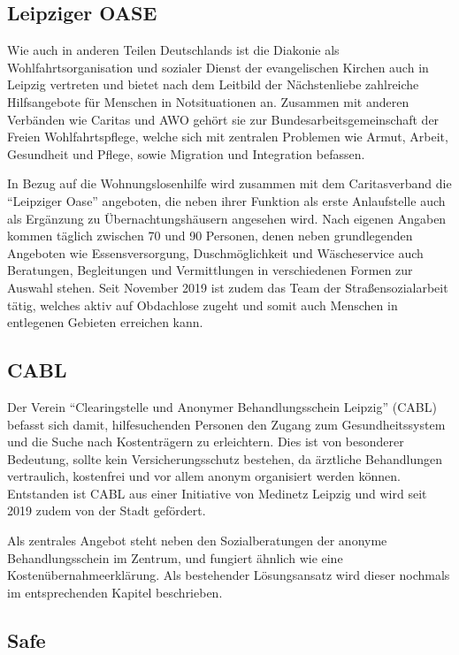 \subsection{Leipziger OASE}

Wie auch in anderen Teilen Deutschlands ist die Diakonie als Wohlfahrtsorganisation und sozialer Dienst der evangelischen Kirchen auch in Leipzig vertreten und bietet nach dem Leitbild der Nächstenliebe zahlreiche Hilfsangebote für Menschen in Notsituationen an. Zusammen mit anderen Verbänden wie Caritas und AWO gehört sie zur Bundesarbeitsgemeinschaft der Freien Wohlfahrtspflege, welche sich mit zentralen Problemen wie Armut, Arbeit, Gesundheit und Pflege, sowie Migration und Integration befassen.

In Bezug auf die Wohnungslosenhilfe wird zusammen mit dem Caritasverband die \enquote{Leipziger Oase} angeboten, die neben ihrer Funktion als erste Anlaufstelle auch als Ergänzung zu Übernachtungshäusern angesehen wird. Nach eigenen Angaben kommen täglich zwischen 70 und 90 Personen, denen neben grundlegenden Angeboten wie Essensversorgung, Duschmöglichkeit und Wäscheservice auch Beratungen, Begleitungen und Vermittlungen in verschiedenen Formen zur Auswahl stehen. Seit November 2019 ist zudem das Team der Straßensozialarbeit tätig, welches aktiv auf Obdachlose zugeht und somit auch Menschen in entlegenen Gebieten erreichen kann. \citep{Diakonie}

\subsection{CABL}

Der Verein \enquote{Clearingstelle und Anonymer Behandlungsschein Leipzig} (\acs{CABL}) befasst sich damit, hilfesuchenden Personen den Zugang zum Gesundheitssystem und die Suche nach Kostenträgern zu erleichtern. Dies ist von besonderer Bedeutung, sollte kein Versicherungsschutz bestehen, da ärztliche Behandlungen vertraulich, kostenfrei und vor allem anonym organisiert werden können. Entstanden ist \ac{CABL} aus einer Initiative von Medinetz Leipzig und wird seit 2019 zudem von der Stadt gefördert.

Als zentrales Angebot steht neben den Sozialberatungen der anonyme Behandlungsschein im Zentrum, und fungiert ähnlich wie eine Kostenübernahmeerklärung. Als bestehender Lösungsansatz wird dieser nochmals im entsprechenden Kapitel beschrieben. \citep{CABL}

\subsection{Safe}

